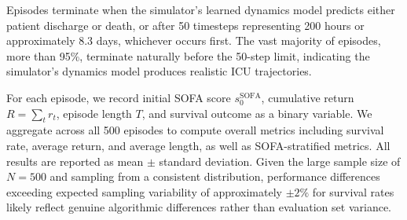 Episodes terminate when the simulator's learned dynamics model predicts either patient discharge or death, or after 50 timesteps representing 200 hours or approximately 8.3 days, whichever occurs first. The vast majority of episodes, more than 95\%, terminate naturally before the 50-step limit, indicating the simulator's dynamics model produces realistic ICU trajectories.

For each episode, we record initial SOFA score $s_0^{\text{SOFA}}$, cumulative return $R = \sum_t r_t$, episode length $T$, and survival outcome as a binary variable. We aggregate across all 500 episodes to compute overall metrics including survival rate, average return, and average length, as well as SOFA-stratified metrics. All results are reported as mean $\pm$ standard deviation. Given the large sample size of $N = 500$ and sampling from a consistent distribution, performance differences exceeding expected sampling variability of approximately $\pm 2\%$ for survival rates likely reflect genuine algorithmic differences rather than evaluation set variance.

